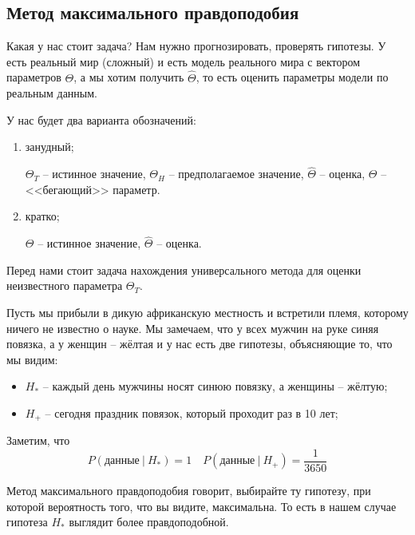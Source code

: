 \documentclass{article}
\begin{document}
\subsection{Метод максимального правдоподобия}

Какая у нас стоит задача? Нам нужно прогнозировать, проверять гипотезы. У есть реальный мир (сложный) и есть модель реального мира с вектором параметров $\Theta$, а мы хотим получить $\hat \Theta$, то есть оценить параметры модели по реальным данным.

У нас будет два варианта обозначений:
\begin{enumerate}
    \item занудный;
    
    $\Theta_T$ -- истинное значение, $\Theta_H$ -- предполагаемое значение, $\hat \Theta$ -- оценка, $\Theta$ -- <<бегающий>> параметр.
    
    \item кратко;
    
    $\Theta$ -- истинное значение, $\hat \Theta$ -- оценка.
\end{enumerate}

Перед нами стоит задача нахождения универсального метода для оценки неизвестного параметра $\Theta_T$.

\medskip

\begin{example}
    Пусть мы прибыли в дикую африканскую местность и встретили племя, которому ничего не известно о науке. Мы замечаем, что у всех мужчин на руке синяя повязка, а у женщин -- жёлтая и у нас есть две гипотезы, объясняющие то, что мы видим:
    \begin{itemize}
        \item $H_*$ -- каждый день мужчины носят синюю повязку, а женщины -- жёлтую;
        \item $H_+$ -- сегодня праздник повязок, который проходит раз в 10 лет;
    \end{itemize}

    Заметим, что
    \[  
        P\left( \text{данные}\ |\ H_* \right) = 1 \quad P\left( \text{данные}\ |\ H_+ \right) = \frac1{3650}
    \]

    Метод максимального правдоподобия говорит, выбирайте ту гипотезу, при которой вероятность того, что вы видите, максимальна. То есть в нашем случае гипотеза $H_*$ выглядит более правдоподобной.
\end{example}
\end{document}

